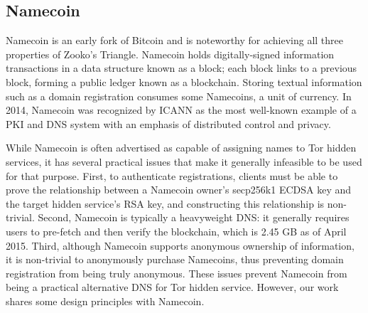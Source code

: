 \subsection{Namecoin}
\label{sec:Namecoin}

Namecoin is an early fork of Bitcoin\cite{nakamoto2008bitcoin} and is noteworthy for achieving all three properties of Zooko's Triangle. Namecoin holds digitally-signed information transactions in a data structure known as a block; each block links to a previous block, forming a public ledger known as a blockchain. Storing textual information such as a domain registration consumes some Namecoins, a unit of currency. In 2014, Namecoin was recognized by ICANN as the most well-known example of a PKI and DNS system with an emphasis of distributed control and privacy.

While Namecoin is often advertised as capable of assigning names to Tor hidden services, it has several practical issues that make it generally infeasible to be used for that purpose. First, to authenticate registrations, clients must be able to prove the relationship between a Namecoin owner's secp256k1 ECDSA key and the target hidden service's RSA key, and constructing this relationship is non-trivial. Second, Namecoin is typically a heavyweight DNS: it generally requires users to pre-fetch and then verify the blockchain, which is 2.45 GB as of April 2015\cite{BitInfoCharts}. Third, although Namecoin supports anonymous ownership of information, it is non-trivial to anonymously purchase Namecoins, thus preventing domain registration from being truly anonymous. These issues prevent Namecoin from being a practical alternative DNS for Tor hidden service. However, our work shares some design principles with Namecoin.
